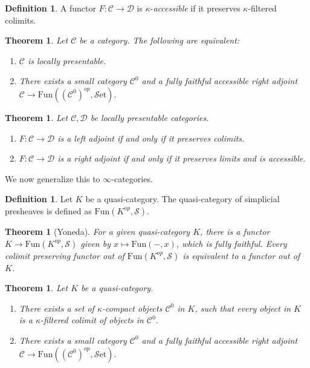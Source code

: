 \documentclass[10pt]{amsart}
\newcommand{\C}{\mathscr{C}}
\newcommand{\D}{\mathscr{D}}
\newcommand{\s}{\mathscr{S}}
\newcommand{\set}{\mathscr{S}\mathrm{et}}
\newcommand{\Fun}{\mathrm{Fun}}
\newtheorem{theorem}[equation]{Theorem}
\theoremstyle{definition}
\newtheorem{definition}[equation]{Definition}
\theoremstyle{remark}
\begin{document}
\begin{definition}
  A functor $F\colon \C \to \D$ is $\kappa$-\emph{accessible} if it preserves $\kappa$-filtered colimits.
\end{definition}


\begin{theorem}
  Let $\C$ be a category. The following are equivalent:
  \begin{enumerate}
    \item $\C$ is locally presentable.
    \item There exists a small category $\C^0$ and a fully faithful accessible right adjoint $\C \to \Fun((\C^0)^{op},\set)$.
  \end{enumerate}
\end{theorem}

\begin{theorem}
  Let $\C,\D$ be locally presentable categories.
  \begin{enumerate}
    \item $F\colon \C \to \D$ is a left adjoint if and only if it preserves colimits.
    \item $F\colon \C \to \D$ is a right adjoint if and only if it preserves limits and is accessible.
  \end{enumerate}
\end{theorem}

We now generalize this to $\infty$-categories. 

\begin{definition}
  Let $K$ be a quasi-category. The quasi-category of simplicial presheaves is defined as $\Fun(K^{op},\s)$.
\end{definition}

\begin{theorem}[Yoneda]
  For a given quasi-category $K$, there is a functor $K \to \Fun(K^{op},\s)$ given by $x \mapsto \Fun(-,x)$, which is fully faithful. Every colimit preserving functor out of $\Fun(K^{op},\s)$ is equivalent to a functor out of $K$.
\end{theorem}

\begin{theorem}
  Let $K$ be a quasi-category.
  \begin{enumerate}
    \item There exists a set of $\kappa$-compact objects $\C^0$ in $K$, such that every object in $K$ is a $\kappa$-filtered colimit of objects in $\C^0$.
    \item There exists a small category $\C^0$ and a fully faithful accessible right adjoint $\C \to \Fun((\C^0)^{op},\set)$.
  \end{enumerate}
\end{theorem}
\end{document}
